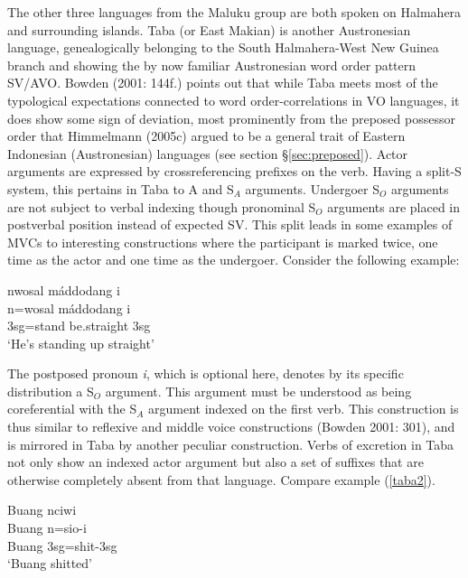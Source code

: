 The other three languages from the Maluku group are both spoken on Halmahera and surrounding islands. Taba (or East Makian) is another Austronesian language, genealogically belonging to the South Halmahera-West New Guinea branch and showing the by now familiar Austronesian word order pattern SV/AVO. Bowden (2001: 144f.) points out that while Taba meets most of the typological expectations connected to word order-correlations in VO languages, it does show some sign of deviation, most prominently from the preposed possessor order that Himmelmann (2005c) argued to be a general trait of Eastern Indonesian (Austronesian) languages (see section §\ref{sec:preposed}). Actor arguments are expressed by crossreferencing prefixes on the verb. Having a split-S system, this pertains in Taba to A and S$_A$ arguments. Undergoer S$_O$ arguments are not subject to verbal indexing though pronominal S$_O$ arguments are placed in postverbal position instead of expected SV. This split leads in some examples of MVCs to interesting constructions where the participant is marked twice, one time as the actor and one time as the undergoer. Consider the following example:

\ea \label{taba1}
\gll nwosal máddodang i \\
n=wosal máddodang i \\
\glc \acs{3}\acs{sg}=stand be.straight \acs{3}\acs{sg} \\
\glft `He's standing up straight' \\ 
\endgl
\xe

The postposed pronoun \textit{i}, which is optional here, denotes by its specific distribution a S$_O$ argument. This argument must be understood as being coreferential with the S$_A$ argument indexed on the first verb. This construction is thus similar to reflexive and middle voice constructions (Bowden 2001: 301), and is mirrored in Taba by another peculiar construction. Verbs of excretion in Taba not only show an indexed actor argument but also a set of suffixes that are otherwise completely absent from that language. Compare example (\ref{taba2}).

\ea \label{taba2}
\gll Buang nciwi \\
Buang n=sio-i \\
\glc Buang \acs{3}\acs{sg}=shit-\acs{3}\acs{sg} \\
\glft `Buang shitted' \\ 
\endgl
\xe

